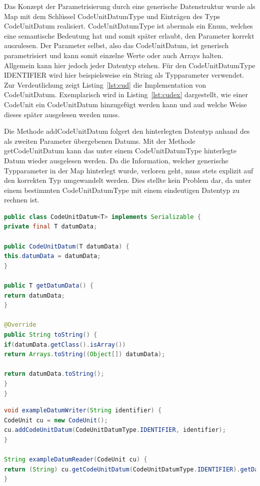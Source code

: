 \documentclass[12pt,oneside,a4paper,parskip]{scrbook}
\begin{document}
Das Konzept der Parametrisierung durch eine generische Datenstruktur wurde als Map mit dem Schlüssel CodeUnitDatumType und Einträgen des Typs CodeUnitDatum realisiert. CodeUnitDatumType ist abermals ein Enum, welches eine semantische Bedeutung hat und somit später erlaubt, den Parameter korrekt auszulesen. Der Parameter selbst, also das CodeUnitDatum, ist generisch parametrisiert und kann somit einzelne Werte oder auch Arrays halten. Allgemein kann hier jedoch jeder Datentyp stehen. Für den CodeUnitDatumType IDENTIFIER wird hier beispielsweise ein String als Typparameter verwendet. Zur Verdeutlichung zeigt Listing~\ref{lst:cud} die Implementation von CodeUnitDatum. Exemplarisch wird in Listing~\ref{lst:cudex} dargestellt, wie einer CodeUnit ein CodeUnitDatum hinzugefügt werden kann und aud welche Weise dieses später ausgelesen werden muss.

Die Methode addCodeUnitDatum folgert den hinterlegten Datentyp anhand des als zweiten Parameter übergebenen Datums. Mit der Methode getCodeUnitDatum kann das unter einem CodeUnitDatumType hinterlegte Datum wieder ausgelesen werden. Da die Information, welcher generische Typparameter in der Map hinterlegt wurde, verloren geht, muss stets explizit auf den korrekten Typ umgewandelt werden. Dies stellte kein Problem dar, da unter einem bestimmten CodeUnitDatumType mit einem eindeutigen Datentyp zu rechnen ist.

\begin{lstlisting}[label=lst:cud,
language=java,
firstnumber=1,
caption=Implementation der Klasse CodeUnitDatum.]
public class CodeUnitDatum<T> implements Serializable {
private final T datumData;

public CodeUnitDatum(T datumData) {
this.datumData = datumData;
}

public T getDatumData() {
return datumData;
}

@Override
public String toString() {
if(datumData.getClass().isArray())
return Arrays.toString((Object[]) datumData);

return datumData.toString();
}
}
\end{lstlisting}

\begin{lstlisting}[label=lst:cudex,
language=java,
firstnumber=1,
caption=Beispiel zum konkreten hinterlegen und auslesen eines CodeUnitDatums.]
void exampleDatumWriter(String identifier) {
CodeUnit cu = new CodeUnit();
cu.addCodeUnitDatum(CodeUnitDatumType.IDENTIFIER, identifier);
}

String exampleDatumReader(CodeUnit cu) {
return (String) cu.getCodeUnitDatum(CodeUnitDatumType.IDENTIFIER).getDatumData();
}
\end{lstlisting}
\end{document}
